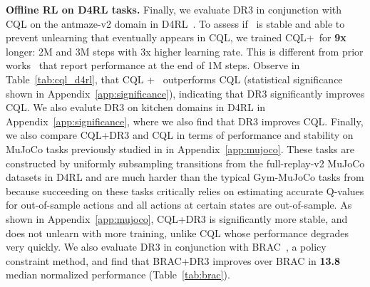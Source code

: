 \textbf{{Offline RL on D4RL tasks.}} Finally, we evaluate DR3 in conjunction with CQL on the antmaze-v2 domain in D4RL~\citep{fu2020d4rl}. To assess if \methodname\ is stable and able to prevent unlearning that eventually appears in CQL, we trained CQL+\methodname\ for \textbf{9x} longer: 2M and 3M steps with 3x higher learning rate. This is different from prior works~\citep{fu2020d4rl} that report performance at the end of 1M steps.
Observe in Table~\ref{tab:cql_d4rl}, that CQL + \methodname\ outperforms CQL ({statistical significance shown in Appendix~\ref{app:significance}}), indicating that DR3 significantly improves CQL. We also evalute DR3 on kitchen domains in D4RL in Appendix~\ref{app:significance}, where we also find that DR3 improves CQL. Finally, we also compare CQL+DR3 and CQL in terms of performance and stability on MuJoCo tasks previously studied in \citet{kumar2021implicit} in Appendix~\ref{app:mujoco}. These tasks are constructed by uniformly subsampling transitions from the full-replay-v2 MuJoCo datasets in D4RL and are much harder than the typical Gym-MuJoCo tasks from \citet{fu2020d4rl} because succeeding on these tasks critically relies on estimating accurate Q-values for out-of-sample actions and all actions at certain states are out-of-sample. As shown in Appendix~\ref{app:mujoco}, CQL+DR3 is significantly more stable, and does not unlearn with more training, unlike CQL whose performance degrades very quickly. We also evaluate DR3 in conjunction with BRAC~\citep{wu2019behavior}, a policy constraint method, and find that BRAC+DR3 improves over BRAC in \textbf{13.8} median normalized performance (Table~\ref{tab:brac}).


